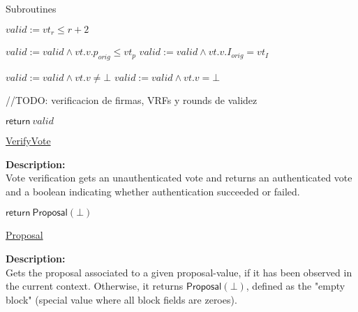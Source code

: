 \documentclass[10pt,a4paper]{article}
\begin{document}
\begin{section}{Subroutines}

\begin{algorithm}[H]\label{algo:verify-vote}
    \begin{algorithmic}[1]
        \State $valid := vt_r \leq r+2$
        
            \State $valid := valid \land vt.v.p_{orig} \leq vt_p$
                \State $valid := valid \land vt.v.I_{orig} = vt_I$
            \EndIf
        \EndIf
        
            \State $valid := valid \land vt.v \neq \bot$
            \State $valid := valid \land vt.v = \bot$
        \EndIf


        //TODO: verificacion de firmas, VRFs y rounds de validez

        \State $\mathsf{return} \ valid$
    \EndFunction
    \end{algorithmic}
    \caption{\underline{VerifyVote}}
\end{algorithm}

\noindent \textbf{Description:}\\
Vote verification gets an unauthenticated vote and returns an authenticated vote and a
boolean indicating whether authentication succeeded or failed.



\begin{algorithm}[H]
    \begin{algorithmic}[1]

        \State $\mathsf{return} \ \mathsf{Proposal}(\bot) $
    \EndIf

    \EndFunction
    \end{algorithmic}
    \caption{\underline{Proposal}}
\end{algorithm}

\noindent \textbf{Description:}\\ Gets the proposal associated to a given proposal-value, 
if it has been observed in the current context.
Otherwise, it returns $\mathsf{Proposal}(\bot)$, defined as the "empty block" (special value where all
block fields are zeroes).


\end{section}
\end{document}
